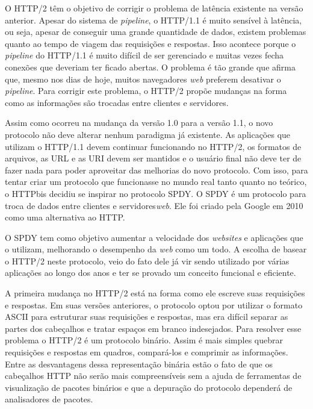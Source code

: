 O HTTP/2 têm o objetivo de corrigir o problema de latência existente na versão anterior. Apesar do sistema de \textit{pipeline}, o HTTP/1.1 é muito sensível à latência, ou seja, apesar de conseguir uma grande quantidade de dados, existem problemas quanto ao tempo de viagem das requisições e respostas. Isso acontece porque o \textit{pipeline} do HTTP/1.1 é muito difícil de ser gerenciado e muitas vezes fecha conexões que deveriam ter ficado abertas. O problema é tão grande que  afirma que, mesmo nos dias de hoje, muitos navegadores \textit{web} preferem desativar o \textit{pipeline}. Para corrigir este problema, o HTTP/2 propõe mudanças na forma como as informações são trocadas entre clientes e servidores.

Assim como ocorreu na mudança da versão 1.0 para a versão 1.1, o novo protocolo não deve alterar nenhum paradigma já existente. As aplicações que utilizam o HTTP/1.1 devem continuar funcionando no HTTP/2, os formatos de arquivos, as URL e as URI devem ser mantidos e o usuário final não deve ter de fazer nada para poder aproveitar das melhorias do novo protocolo. Com isso, para tentar criar um protocolo que funcionasse no mundo real tanto quanto no teórico, o HTTPbis decidiu se inspirar no protocolo SPDY. O SPDY \cite{SPDY} é um protocolo para troca de dados entre clientes e servidores\textit{web}. Ele foi criado pela Google em 2010 como uma alternativa ao HTTP.

O SPDY tem como objetivo aumentar a velocidade dos \textit{websites} e aplicações que o utilizam, melhorando o desempenho da \textit{web} como um todo. A escolha de basear o HTTP/2 neste protocolo, veio do fato dele já vir sendo utilizado por várias aplicações ao longo dos anos e ter se provado um conceito funcional e eficiente.

A primeira mudança no HTTP/2 está na forma como ele escreve suas requisições e respostas. Em suas versões anteriores, o protocolo optou por utilizar o formato ASCII para estruturar suas requisições e respostas, mas era difícil separar as partes dos cabeçalhos e tratar espaços em branco indesejados. Para resolver esse problema o HTTP/2 é um protocolo binário. Assim é mais simples quebrar requisições e respostas em quadros, compará-los e comprimir as informações. Entre as desvantagens dessa representação binária estão o fato de que os cabeçalhos HTTP não serão mais compreensíveis sem a ajuda de ferramentas de visualização de pacotes binários e que a depuração do protocolo dependerá de analisadores de pacotes.

